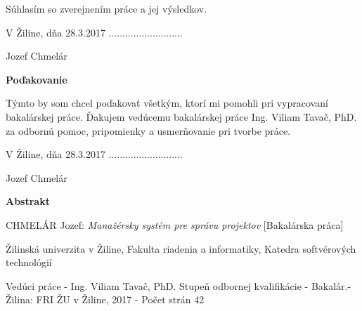 Súhlasím so zverejnením práce a jej výsledkov.

\vspace{2em}

V Žiline, dňa 28.3.2017 \hfill ...........................

\hfill Jozef Chmelár \hspace{0,5em}

\pagebreak


\pagebreak
\hfill
\vfill

\begin{center}

\sc\Large\textbf{Poďakovanie}

\end{center}

Týmto by som chcel poďakovať všetkým, ktorí mi pomohli pri vypracovaní bakalárskej práce. Ďakujem vedúcemu bakalárskej práce Ing. Viliam Tavač, PhD. za odbornú pomoc, pripomienky a usmerňovanie pri tvorbe práce.

\vspace{2em}

V Žiline, dňa 28.3.2017 \hfill ...........................

\hfill Jozef Chmelár \hspace{0,5em}

\pagebreak


\pagebreak

\begin{center}

\sc\Large\textbf{Abstrakt}
    
\end{center}

\noindent
{\sc CHMELÁR Jozef:} {\em Manažérsky systém pre správu projektov}
[Bakalárska práca] 

\noindent
Žilinská univerzita v Žiline,  
Fakulta riadenia a informatiky,  
Katedra softvérových technológií

\noindent  
Vedúci práce - Ing. Viliam Tavač, PhD. Stupeň odbornej kvalifikácie - Bakalár.- Žilina: FRI ŽU v Žiline, 2017 - Počet strán 42 
\noindent 



\vspace{1em}

